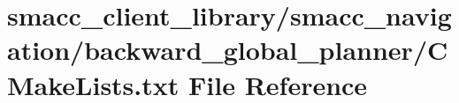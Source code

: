 \hypertarget{smacc__client__library_2smacc__navigation_2backward__global__planner_2CMakeLists_8txt}{}\section{smacc\+\_\+client\+\_\+library/smacc\+\_\+navigation/backward\+\_\+global\+\_\+planner/\+C\+Make\+Lists.txt File Reference}
\label{smacc__client__library_2smacc__navigation_2backward__global__planner_2CMakeLists_8txt}
